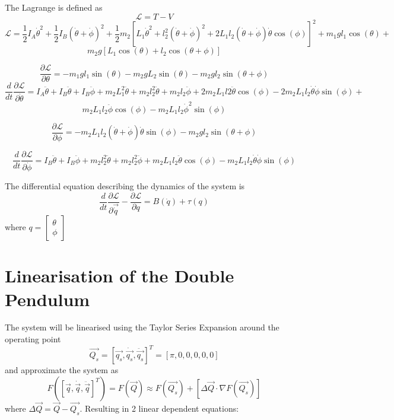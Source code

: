 \documentclass[a4paper,12pt]{article}
\begin{document}
\begin{appendices}
		The Lagrange is defined as 
		$$\mathcal{L}=T-V$$
		$$\mathcal{L} = \frac{1}{2}I_{A}\dot{\theta}^2 + \frac{1}{2}I_{B}(\dot{\theta}+\dot{\phi})^2 + \frac{1}{2}m_{2}[L_{1}\dot{\theta}^2+l_{2}^2(\dot{\theta}+\dot{\phi})^2 + 
		2L_{1}l_{2}(\dot{\theta}+\dot{\phi})\dot{\theta}\cos(\phi)]^2+m_{1}gl_{1}\cos(\theta)+$$
		$$m_{2}g[L_{1}\cos(\theta)+l_{2}\cos(\theta+\phi)]$$
		
		$$\frac{\partial\mathcal{L}}{\partial\theta} = -m_{1}gl_{1}\sin(\theta)-m_{2}gL_{2}\sin(\theta)-m_{2}gl_{2}\sin(\theta+\phi)$$
		$$\frac{d}{dt}\frac{\partial\mathcal{L}}{\partial\dot{\theta}} = I_{A}\ddot{\theta}+I_{B}\ddot{\theta}+I_{B}\ddot{\phi}+m_{2}L_{1}^2\ddot{\theta}+m_{2}l_{2}^2\ddot{\theta}+m_{2}l_{2}\ddot{\phi}+2m_{2}L_{1}l{2}\ddot{\theta}\cos(\phi)-2m_{2}L_{1}l_{2}\dot{\theta}\dot{\phi}\sin(\phi)+$$
		$$m_{2}L_{1}l_{2}\ddot{\phi}\cos(\phi)-m_{2}L_{1}l_{2}\dot{\phi}^2\sin(\phi)$$
		
		
		$$\frac{\partial\mathcal{L}}{\partial\phi} = -m_{2}L_{1}l_{2}(\dot{\theta}+\dot{\phi})\dot{\theta}\sin(\phi)-m_{2}gl_{2}\sin(\theta+\phi)$$
		
		$$\frac{d}{dt}\frac{\partial\mathcal{L}}{\partial\dot{\phi}}=I_{B}\ddot{\theta}+I_{B}\ddot{\phi}+m_{2}l_{2}^2\ddot{\theta}+m_{2}l_{2}^2\ddot{\phi}+m_{2}L_{1}l_{2}\ddot{\theta}\cos(\phi)-m_{2}L_{1}l_{2}\dot{\theta}\dot{\phi}\sin(\phi)$$
		
		The differential equation describing the dynamics of the system is
		$$\frac{d}{dt}\frac{\partial\mathcal{L}}{\partial\vec{\dot{q}}}-\frac{\partial\mathcal{L}}{\partial q} = B(\dot{q})+\tau(q)$$ 
		where  $ q = 
		\begin{bmatrix}
		\theta \\
		\phi
		\end{bmatrix}
		$
		
		\newpage
		\section{Linearisation of the Double Pendulum}
			
		The system will be linearised using the Taylor Series Expansion around the operating point $$ \vec{Q_{s}} = [\vec{q_{s}},\dot{\vec{q_{s}}},\ddot{\vec{q_{s}}}]^{T}=[\pi,0,0,0,0,0]$$ and approximate the system as $$F([\vec{q},\dot{\vec{q}},\ddot{\vec{q}} ]^{T}) = F(\vec{Q}) \approx F(\vec{Q_{s}})+[\Delta{\vec{Q}}\cdot\nabla F(\vec{Q_{s}})] $$
		where $\Delta{\vec{Q}} = \vec{Q} - \vec{Q_{s}} $. Resulting in 2 linear dependent equations:
		

\end{appendices}
\end{document}
